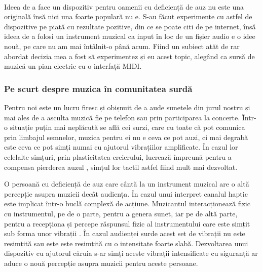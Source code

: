 \documentclass[../IoMusT.tex]{subfiles}
\begin{document}
\\
 \par Ideea de a face un dispozitiv pentru oamenii cu deficiență de auz nu este una originală însă nici una foarte populară nu e. S-au făcut experimente cu astfel de dispozitive pe piață cu rezultate pozitive, din ce se poate citi de pe internet, însă ideea de a folosi un instrument muzical ca input în loc de un fișier audio e o idee nouă, pe care nu am mai întâlnit-o până acum. Fiind un subiect atăt de rar abordat decizia mea a fost să experimentez și eu acest topic, alegând ca sursă de muzică un pian electric cu o interfață MIDI.

\subsubsection{Pe scurt despre muzica în comunitatea surdă}
Pentru noi este un lucru firesc și obișnuit de a aude sunetele din jurul nostru și mai ales de a asculta muzică fie pe telefon sau prin participarea la concerte. Într-o situație puțin mai neplăcută se află cei surzi, care cu toate că pot comunica prin limbajul semnelor, muzica pentru ei nu e ceva ce pot auzi, ci mai degrabă este ceva ce pot simți numai cu ajutorul vibrațiilor amplificate. În cazul lor celelalte simțuri, prin plasticitatea creierului, lucrează împreună pentru a compensa pierderea auzul \cite{DEAF}, simțul lor tactil astfel fiind mult mai dezvoltat. 
\\
\par O persoană cu deficiență de auz care cântă la un instrument muzical are o altă percepție asupra muzicii decât audiența. În cazul unui interpret canalul haptic este implicat într-o buclă complexă de acțiune. Muzicantul interacționează fizic cu instrumentul, pe de o parte, pentru a genera sunet, iar pe de altă parte, pentru a recepționa și percepe răspunsul fizic al instrumentului care este simțit sub forma unor vibrații \cite{Haptic}. În cazul audienței surde acest set de vibrații nu este resimțită sau este este resimțită cu o intensitate foarte slabă. Dezvoltarea unui dispozitiv cu ajutorul căruia s-ar simți aceste vibrații intensificate cu siguranță ar aduce o nouă percepție asupra muzicii pentru aceste persoane.
\end{document}
